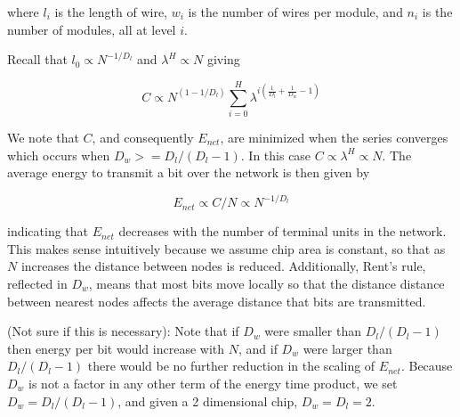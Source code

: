 \documentclass[12pt]{article}
\begin{document}

where $l_i$ is the length of wire, $w_i$ is the number of wires per module, and $n_i$ is the number of modules, all at level $i$.

Recall that $l_0 \propto N^{-1/D_l}$ and $\lambda^H \propto N$ giving 

\begin{equation}
C \propto  N^{(1- 1/D_l)} \sum_{i=0}^H \lambda^{i \left( 
\frac{1}{D_l} + \frac{1}{D_w} -1 \right)}
\end{equation}


We note that $C$, and consequently $E_{net}$, are minimized when the series converges which occurs when
$D_w >= D_l / (D_l -1)$. In this case  $C \propto \lambda^H \propto N$. The average energy to transmit a bit over the network is then given by 

\begin{equation}
E_{net} \propto C/N \propto N^{-1/D_l} 
\end{equation}

indicating that $E_{net}$ decreases with the number of terminal units in the network. This makes sense intuitively because we assume chip area is constant, so that as $N$ increases the distance between nodes is reduced. Additionally, Rent's rule, reflected in $D_w$, means that most bits move locally so that the distance distance between nearest nodes affects the average distance that bits are transmitted. 

(Not sure if this is necessary): Note that if $D_w$ were smaller than $D_l / (D_l -1)$ then energy per bit would increase with $N$, and if $D_w$ were larger than $D_l / (D_l -1)$ there would be no further reduction in the scaling of $E_{net}$. Because $D_w$ is not a factor in any other term of the energy time product, we set $D_w = D_l / (D_l -1)$, and given a 2 dimensional chip, $D_w = D_l = 2$.
\end{document}
